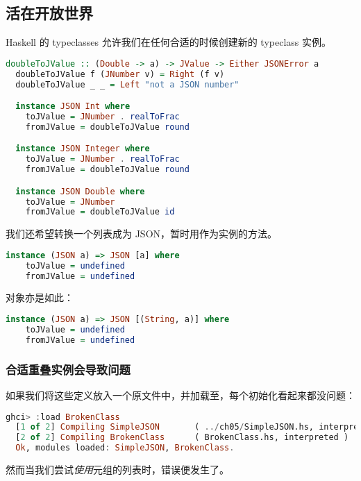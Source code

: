 \documentclass[./main.tex]{subfiles}
\begin{document}
\subsection*{活在开放世界}

Haskell 的 typeclasses 允许我们在任何合适的时候创建新的 typeclass 实例。

\begin{lstlisting}[language=Haskell]
  doubleToJValue :: (Double -> a) -> JValue -> Either JSONError a
  doubleToJValue f (JNumber v) = Right (f v)
  doubleToJValue _ _ = Left "not a JSON number"

  instance JSON Int where
    toJValue = JNumber . realToFrac
    fromJValue = doubleToJValue round

  instance JSON Integer where
    toJValue = JNumber . realToFrac
    fromJValue = doubleToJValue round

  instance JSON Double where
    toJValue = JNumber
    fromJValue = doubleToJValue id
\end{lstlisting}

我们还希望转换一个列表成为 JSON，暂时用作为实例的方法。

\begin{lstlisting}[language=Haskell]
  instance (JSON a) => JSON [a] where
    toJValue = undefined
    fromJValue = undefined
\end{lstlisting}

对象亦是如此：

\begin{lstlisting}[language=Haskell]
  instance (JSON a) => JSON [(String, a)] where
    toJValue = undefined
    fromJValue = undefined
\end{lstlisting}

\subsubsection*{合适重叠实例会导致问题}

如果我们将这些定义放入一个原文件中，并加载至，每个初始化看起来都没问题：

\begin{lstlisting}[language=Haskell]
  ghci> :load BrokenClass
  [1 of 2] Compiling SimpleJSON       ( ../ch05/SimpleJSON.hs, interpreted )
  [2 of 2] Compiling BrokenClass      ( BrokenClass.hs, interpreted )
  Ok, modules loaded: SimpleJSON, BrokenClass.
\end{lstlisting}

然而当我们尝试\textit{使用}元组的列表时，错误便发生了。
\end{document}
